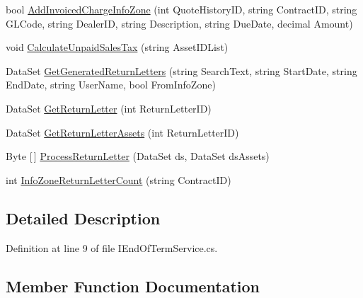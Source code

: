 \begin{DoxyCompactItemize}
bool \mbox{\hyperlink{interface_g_f_s_c_1_1_services_1_1_end_of_term_1_1_i_end_of_term_service_a7f613b68af6aba960e113b1d272450ff}{Add\+Invoiced\+Charge\+Info\+Zone}} (int Quote\+History\+ID, string Contract\+ID, string G\+L\+Code, string Dealer\+ID, string Description, string Due\+Date, decimal Amount)
\item 
void \mbox{\hyperlink{interface_g_f_s_c_1_1_services_1_1_end_of_term_1_1_i_end_of_term_service_a06c356526a52c46532fbe269341ba77f}{Calculate\+Unpaid\+Sales\+Tax}} (string Asset\+I\+D\+List)
\item 
Data\+Set \mbox{\hyperlink{interface_g_f_s_c_1_1_services_1_1_end_of_term_1_1_i_end_of_term_service_af612f3dcfbbdfe18881e5fdc0439fa26}{Get\+Generated\+Return\+Letters}} (string Search\+Text, string Start\+Date, string End\+Date, string User\+Name, bool From\+Info\+Zone)
\item 
Data\+Set \mbox{\hyperlink{interface_g_f_s_c_1_1_services_1_1_end_of_term_1_1_i_end_of_term_service_ac7d380c74b75c3043b9fd1691d33a4ca}{Get\+Return\+Letter}} (int Return\+Letter\+ID)
\item 
Data\+Set \mbox{\hyperlink{interface_g_f_s_c_1_1_services_1_1_end_of_term_1_1_i_end_of_term_service_a155ca27f73b93aa5c4e92c159d34647e}{Get\+Return\+Letter\+Assets}} (int Return\+Letter\+ID)
\item 
Byte \mbox{[}$\,$\mbox{]} \mbox{\hyperlink{interface_g_f_s_c_1_1_services_1_1_end_of_term_1_1_i_end_of_term_service_a5f9aaee8a7a76fc2575dd6806348074c}{Process\+Return\+Letter}} (Data\+Set ds, Data\+Set ds\+Assets)
\item 
int \mbox{\hyperlink{interface_g_f_s_c_1_1_services_1_1_end_of_term_1_1_i_end_of_term_service_a5e44a51ef8aa9c8c01ef89ec860ffedc}{Info\+Zone\+Return\+Letter\+Count}} (string Contract\+ID)
\end{DoxyCompactItemize}


\subsection{Detailed Description}


Definition at line 9 of file I\+End\+Of\+Term\+Service.\+cs.



\subsection{Member Function Documentation}
\mbox{\label{interface_g_f_s_c_1_1_services_1_1_end_of_term_1_1_i_end_of_term_service_ad9dcc5514a7bad9a4ba308d1cf72e554}} 
